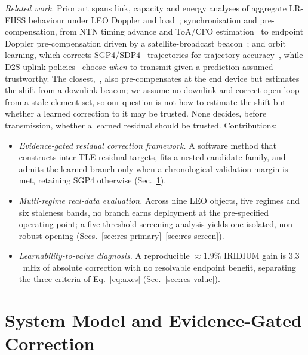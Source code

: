 \documentclass[conference]{IEEEtran}
\begin{document}
\emph{Related work.} Prior art spans link, capacity and energy analyses of
aggregate LR-FHSS behaviour under LEO Doppler and
load~\cite{semtech2023lrfhss,ullah2022lrfhss,hurn2023lrfhss}; synchronisation and
pre-compensation, from NTN timing advance and ToA/CFO
estimation~\cite{3gpp2019tr38821} to endpoint Doppler pre-compensation driven by
a satellite-broadcast beacon~\cite{ullah2025precomp}; and orbit learning, which
corrects SGP4/SDP4~\cite{hoots1980models} trajectories for trajectory
accuracy~\cite{peng2019gp,acciarini2025dsgp4,caldas2024mlorbit}, while D2S uplink
policies~\cite{alvarez2022uplink} choose \emph{when} to transmit given a
prediction assumed trustworthy. The closest,~\cite{ullah2025precomp}, also
pre-compensates at the end device but estimates the shift from a downlink beacon;
we assume no downlink and correct open-loop from a stale element set, so our
question is not how to estimate the shift but whether a learned correction to it
may be trusted. None decides, before transmission, whether a learned residual
should be trusted. Contributions:
\begin{itemize}
\item \emph{Evidence-gated residual correction framework.} A software method
that constructs inter-TLE residual targets, fits a nested candidate family, and
admits the learned branch only when a chronological validation margin is met,
retaining SGP4 otherwise (Sec.~\ref{sec:method}).
\item \emph{Multi-regime real-data evaluation.} Across nine LEO objects, five
regimes and six staleness bands, no branch earns deployment at the pre-specified
operating point; a five-threshold screening analysis yields one isolated,
non-robust opening (Secs.~\ref{sec:res-primary}--\ref{sec:res-screen}).
\item \emph{Learnability-to-value diagnosis.} A reproducible $\approx1.9\%$
IRIDIUM gain is $3.3$~mHz of absolute correction with no resolvable
endpoint benefit, separating the three criteria of Eq.~\eqref{eq:axes}
(Sec.~\ref{sec:res-value}).
\end{itemize}

\section{System Model and Evidence-Gated Correction}
\label{sec:method}
\end{document}
